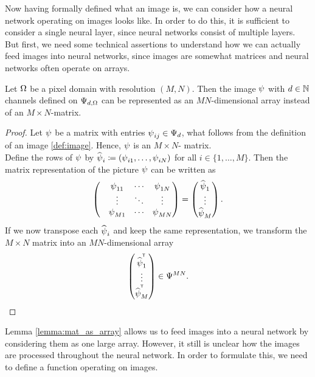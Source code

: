 Now having formally defined what an image is, we can consider how a neural network operating on images looks like. In order to do this, it is sufficient to consider a single neural layer, since neural networks consist of multiple layers. But first, we need some technical assertions to understand how we can actually feed images into neural networks, since images are somewhat matrices and neural networks often operate on arrays.


\begin{lemma}\label{lemma:mat_as_array}
Let $\Omega$ be a pixel domain with resolution $(M,N)$. Then the image $\operatorname{\psi}$ with $d\in\operatorname{\mathbb{N}}$ channels defined on $\Psi_{d,\Omega}$ can be represented as an $MN$-dimensional array instead of an $M\times N$-matrix.
\end{lemma}


\begin{proof}
Let $\operatorname{\psi}$ be a matrix with entries $\operatorname{\psi}_{ij}\in\Psi_d$, what follows from the definition of an image \ref{def:image}. Hence, $\operatorname{\psi}$ is an $M\times N$- matrix.\\
Define the rows of $\operatorname{\psi}$ by $\widehat{\operatorname{\psi}}_i\coloneqq (\operatorname{\psi}_{i1},\ldots,\operatorname{\psi}_{iN})$ for all $i\in \{1,\ldots,M\}$. Then the matrix representation of the picture $\operatorname{\psi}$ can be written as
\begin{align*}
\begin{pmatrix}
&\operatorname{\psi}_{11} &\cdots &\operatorname{\psi}_{1N}\\
&\vdots  &\ddots		 &\vdots\\
&\operatorname{\psi}_{M1} &\cdots &\operatorname{\psi}_{MN}
\end{pmatrix}=
\begin{pmatrix}
\widehat{\operatorname{\psi}}_1\\
\vdots\\
\widehat{\operatorname{\psi}}_M
\end{pmatrix}.
\end{align*}
If we now transpose each $\widehat{\operatorname{\psi}}_i$ and keep the same representation, we transform the $M\times N$ matrix into an $MN$-dimensional array
\begin{align*}
 \begin{pmatrix}
\widehat{\operatorname{\psi}}^{^{\mkern-1.5mu\mathsf{T}}}_1\\
\vdots\\
\widehat{\operatorname{\psi}}^{^{\mkern-1.5mu\mathsf{T}}}_M
\end{pmatrix} \in \Psi^{MN}.
\end{align*}
\end{proof}

Lemma \ref{lemma:mat_as_array} allows us to feed images into a neural network by considering them as one large array. However, it still is unclear how the images are processed throughout the neural network. In order to formulate this, we need to define a function operating on images.

